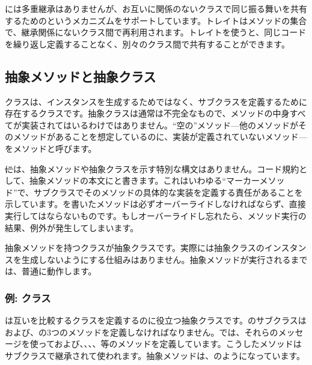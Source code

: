 \documentclass[a4paper,10pt,twoside]{book}
\begin{document}


\pharo には多重継承はありませんが、お互いに関係のないクラスで同じ振る舞いを共有するためのというメカニズムをサポートしています。トレイトはメソッドの集合で、継承関係にないクラス間で再利用されます。トレイトを使うと、同じコードを繰り返し定義することなく、別々のクラス間で共有することができます。

\subsection{抽象メソッドと抽象クラス}

クラスは、インスタンスを生成するためではなく、サブクラスを定義するために存在するクラスです。抽象クラスは通常は不完全なもので、メソッドの中身すべてが実装されてはいるわけではありません。``空の''メソッド---他のメソッドがそのメソッドがあることを想定しているのに、実装が定義されていないメソッド---をメソッドと呼びます。

\st には、抽象メソッドや抽象クラスを示す特別な構文はありません。コード規約として、抽象メソッドの本文に\mbox{}と書きます。これはいわゆる``マーカーメソッド''で、サブクラスでそのメソッドの具体的な実装を定義する責任があることを示しています。を書いたメソッドは必ずオーバーライドしなければならず、直接実行してはならないものです。もしオーバーライドし忘れたら、メソッド実行の結果、例外が発生してしまいます。

抽象メソッドを持つクラスが抽象クラスです。実際には抽象クラスのインスタンスを生成しないようにする仕組みはありません。抽象メソッドが実行されるまでは、普通に動作します。

\subsubsection{例: クラス}
は互いを比較するクラスを定義するのに役立つ抽象クラスです。のサブクラスは\ct{<}および\ct{=}、の3つのメソッドを定義しなければなりません。では、それらのメッセージを使って\ct{>}および\ct{>=}、\ct{<=}、、、等のメソッドを定義しています。こうしたメソッドはサブクラスで継承されて使われます。抽象メソッドは、のようになっています。
\end{document}
